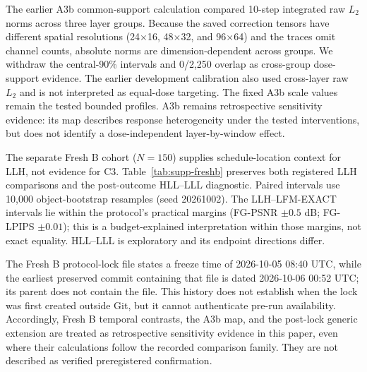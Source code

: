 \documentclass[11pt]{article}
\begin{document}
The earlier A3b common-support calculation compared 10-step integrated raw $L_2$ norms across three layer groups. Because the saved correction tensors have different spatial resolutions (24$\times$16, 48$\times$32, and 96$\times$64) and the traces omit channel counts, absolute norms are dimension-dependent across groups. We withdraw the central-90\% intervals and 0/2,250 overlap as cross-group dose-support evidence. The earlier development calibration also used cross-layer raw $L_2$ and is not interpreted as equal-dose targeting. The fixed A3b scale values remain the tested bounded profiles. A3b remains retrospective sensitivity evidence: its map describes response heterogeneity under the tested interventions, but does not identify a dose-independent layer-by-window effect.

The separate Fresh B cohort ($N=150$) supplies schedule-location context for LLH, not evidence for C3. Table~\ref{tab:supp-freshb} preserves both registered LLH comparisons and the post-outcome HLL--LLL diagnostic. Paired intervals use 10,000 object-bootstrap resamples (seed 20261002). The LLH--LFM-EXACT intervals lie within the protocol's practical margins (FG-PSNR $\pm0.5$ dB; FG-LPIPS $\pm0.01$); this is a budget-explained interpretation within those margins, not exact equality. HLL--LLL is exploratory and its endpoint directions differ.

The Fresh B protocol-lock file states a freeze time of 2026-10-05 08:40 UTC, while the earliest preserved commit containing that file is dated 2026-10-06 00:52 UTC; its parent does not contain the file. This history does not establish when the lock was first created outside Git, but it cannot authenticate pre-run availability. Accordingly, Fresh B temporal contrasts, the A3b map, and the post-lock generic extension are treated as retrospective sensitivity evidence in this paper, even where their calculations follow the recorded comparison family. They are not described as verified preregistered confirmation.
\end{document}
